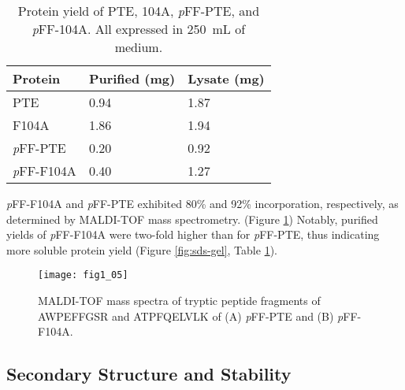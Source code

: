 \begin{refsection}
\begin{table}[htbp]
\centering
\caption[Protein yield of PTE, 104A, \emph{p}FF-PTE, and \emph{p}FF-104A. All
expressed in \SI{250}{\mL} of medium.]{Protein yield of PTE, 104A,
    \emph{p}FF-PTE, and \emph{p}FF-104A. All expressed in \SI{250}{\mL} of
medium.} 

\begin{tabular}{ lll }
  \hline
  Protein & Purified (mg) & Lysate (mg) \\
  \hline
  PTE & 0.94 & 1.87  \\
  F104A & 1.86 & 1.94  \\
  \emph{p}FF-PTE & 0.20 & 0.92  \\
  \emph{p}FF-F104A & 0.40 & 1.27  \\
  \hline

\end{tabular}
\label{tab:protein-yield} 
\end{table}

\emph{p}FF-F104A and \emph{p}FF-PTE exhibited 80\% and 92\%
incorporation, respectively, as determined by MALDI-TOF
mass spectrometry. (Figure \ref{fig:MALDI-fig}) Notably, purified yields of
\emph{p}FF-F104A were two-fold higher than for \emph{p}FF-PTE, thus indicating
more soluble protein yield (Figure \ref{fig:sds-gel}, Table
\ref{tab:protein-yield}).
\begin{figure}[htbp] \centering \texttt{[image: fig1\_05]}
    \caption[MALDI-TOF mass spectra of tryptic peptide fragments of AWPEFFGSR
    and ATPFQELVLK of (A) \emph{p}FF-PTE and (B) \emph{p}FF-F104A.] {MALDI-TOF
        mass spectra of tryptic peptide fragments of  AWPEFFGSR and ATPFQELVLK
        of (A) \emph{p}FF-PTE and (B) \emph{p}FF-F104A.}
        \label{fig:MALDI-fig}
\end{figure}

\subsection{Secondary Structure and Stability}


\end{refsection}
